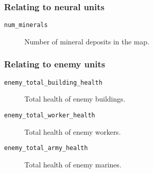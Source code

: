 \subsubsection*{Relating to neural units}
\begin{description}
    \item[\texttt{num\_minerals}] Number of mineral deposits in the map.
\end{description}

\subsubsection*{Relating to enemy units}
\begin{description}
    \item[\texttt{enemy\_total\_building\_health}] Total health of enemy buildings.
    \item[\texttt{enemy\_total\_worker\_health}] Total health of enemy workers.
    \item[\texttt{enemy\_total\_army\_health}] Total health of enemy marines.
\end{description}